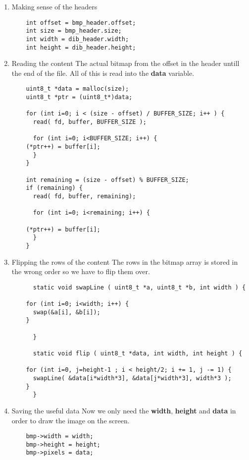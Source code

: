 \begin{enumerate}
\begin{lstlisting}
    }
  \end{lstlisting}

\item Making sense of the headers
  \begin{lstlisting}
    int offset = bmp_header.offset;
    int size = bmp_header.size;
    int width = dib_header.width;
    int height = dib_header.height;
  \end{lstlisting}
\item Reading the content \newline
The actual bitmap from the offset in the header untill the end of the
file. All of this is read into the {\bf data} variable.
  \begin{lstlisting}
    uint8_t *data = malloc(size);
    uint8_t *ptr = (uint8_t*)data;

    for (int i=0; i < (size - offset) / BUFFER_SIZE; i++ ) {
      read( fd, buffer, BUFFER_SIZE );

      for (int i=0; i<BUFFER_SIZE; i++) {
	(*ptr++) = buffer[i];
      }
    }

    int remaining = (size - offset) % BUFFER_SIZE;
    if (remaining) {
      read( fd, buffer, remaining);

      for (int i=0; i<remaining; i++) {

	(*ptr++) = buffer[i];
      }
    }
  \end{lstlisting}

  \item Flipping the rows of the content \newline
The rows in the bitmap array is stored in the wrong order so
we have to flip them over.
    \begin{lstlisting}
      static void swapLine ( uint8_t *a, uint8_t *b, int width ) {

	for (int i=0; i<width; i++) {
	  swap(&a[i], &b[i]);
	}

      }

      static void flip ( uint8_t *data, int width, int height ) {

	for (int i=0, j=height-1 ; i < height/2; i += 1, j -= 1) {
	  swapLine( &data[i*width*3], &data[j*width*3], width*3 );
	}
      }
    \end{lstlisting}
  \item Saving the useful data\newline
Now we only need the {\bf width}, {\bf height} and {\bf data} in order
to draw the image on the screen.
    \begin{lstlisting}
	bmp->width = width;
	bmp->height = height;
	bmp->pixels = data;
    \end{lstlisting}
\end{enumerate}
